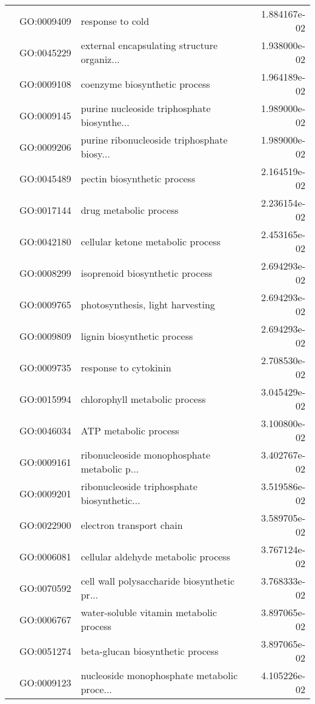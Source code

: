 \begin{longtable}{lllr}
   & GO:0009409 &                             response to cold &  1.884167e-02 \\
   & GO:0045229 &  external encapsulating structure organiz... &  1.938000e-02 \\
   & GO:0009108 &                coenzyme biosynthetic process &  1.964189e-02 \\
   & GO:0009145 &  purine nucleoside triphosphate biosynthe... &  1.989000e-02 \\
   & GO:0009206 &  purine ribonucleoside triphosphate biosy... &  1.989000e-02 \\
   & GO:0045489 &                  pectin biosynthetic process &  2.164519e-02 \\
   & GO:0017144 &                       drug metabolic process &  2.236154e-02 \\
   & GO:0042180 &            cellular ketone metabolic process &  2.453165e-02 \\
   & GO:0008299 &              isoprenoid biosynthetic process &  2.694293e-02 \\
   & GO:0009765 &             photosynthesis, light harvesting &  2.694293e-02 \\
   & GO:0009809 &                  lignin biosynthetic process &  2.694293e-02 \\
   & GO:0009735 &                        response to cytokinin &  2.708530e-02 \\
   & GO:0015994 &                chlorophyll metabolic process &  3.045429e-02 \\
   & GO:0046034 &                        ATP metabolic process &  3.100800e-02 \\
   & GO:0009161 &  ribonucleoside monophosphate metabolic p... &  3.402767e-02 \\
   & GO:0009201 &  ribonucleoside triphosphate biosynthetic... &  3.519586e-02 \\
   & GO:0022900 &                     electron transport chain &  3.589705e-02 \\
   & GO:0006081 &          cellular aldehyde metabolic process &  3.767124e-02 \\
   & GO:0070592 &  cell wall polysaccharide biosynthetic pr... &  3.768333e-02 \\
   & GO:0006767 &      water-soluble vitamin metabolic process &  3.897065e-02 \\
   & GO:0051274 &             beta-glucan biosynthetic process &  3.897065e-02 \\
   & GO:0009123 &  nucleoside monophosphate metabolic proce... &  4.105226e-02 \\

\end{longtable}
